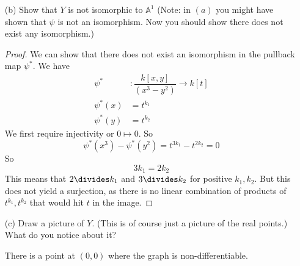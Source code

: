 \documentclass{article}
\begin{document}
\begin{itemize}
        \item [(b)] Show that $Y$ is not isomorphic to $\mathbb{A}^{1}$ (Note: in $(a)$ you might have shown that $\psi$ is not an isomorphism. Now you should show there does not exist any isomorphism.)
            \begin{proof}
                We can show that there does not exist an isomorphism in the pullback map $\psi^{*}$. We have
                    \begin{align*}
                        \psi^{*}    &: \dfrac{k[x, y]}{(x^{3} - y^{2})} \rightarrow k[t] \\
                        \psi^{*}(x) &= t^{k_{1}}                                         \\
                        \psi^{*}(y) &= t^{k_{2}}                                           
                    \end{align*}
                We first require injectivity or $0 \mapsto 0$. So 
                    \begin{equation*}
                        \psi^{*}(x^{3}) - \psi^{*}(y^{2}) = t^{3k_{1}} - t^{2k_{2}} = 0
                    \end{equation*}
                So 
                    \begin{equation*}
                        3k_{1} = 2k_{2}
                    \end{equation*}
                This means that $2 \divides k_{1}$ and $3 \divides k_{2}$ for positive $k_{1}, k_{2}$. But this does not yield a surjection, as there is no linear combination of products of $t^{k_{1}}, t^{k_{2}}$ that would hit $t$ in the image.
            \end{proof}

        \item [(c)] Draw a picture of $Y$. (This is of course just a picture of the real points.) What do you notice about it?
            \begin{center}
            \end{center}
        There is a point at $(0, 0)$ where the graph is non-differentiable.


\end{itemize}
\end{document}

